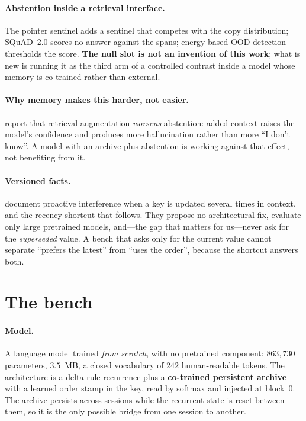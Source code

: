 \documentclass[11pt,a4paper]{article}
\begin{document}
\paragraph{Abstention inside a retrieval interface.} The pointer sentinel
\citep{merity2016pointer} adds a sentinel that competes with the copy distribution; SQuAD~2.0
\citep{rajpurkar2018squad2} scores no-answer against the spans; energy-based OOD detection
\citep{liu2020energy} thresholds the score. \textbf{The null slot is not an invention of this work};
what is new is running it as the third arm of a controlled contrast inside a model whose memory is
co-trained rather than external.

\paragraph{Why memory makes this harder, not easier.} \citet{joren2024sufficient} report that
retrieval augmentation \emph{worsens} abstention: added context raises the model's confidence and
produces more hallucination rather than more ``I don't know''. A model with an archive plus
abstention is working against that effect, not benefiting from it.

\paragraph{Versioned facts.} \citet{wang2025unable} document proactive interference when a key is
updated several times in context, and the recency shortcut that follows. They propose no
architectural fix, evaluate only large pretrained models, and---the gap that matters for us---never
ask for the \emph{superseded} value. A bench that asks only for the current value cannot separate
``prefers the latest'' from ``uses the order'', because the shortcut answers both.

\section{The bench}
\label{sec:bench}

\paragraph{Model.} A language model trained \emph{from scratch}, with no pretrained component:
$863{,}730$ parameters, $3.5$~MB, a closed vocabulary of $242$ human-readable tokens. The
architecture is a delta rule recurrence plus a \textbf{co-trained persistent archive} with a learned
order stamp in the key, read by softmax and injected at block~0. The archive persists across
sessions while the recurrent state is reset between them, so it is the only possible bridge from
one session to another.
\end{document}
